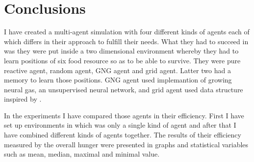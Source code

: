 \chapter{Conclusions}

I have created a multi-agent simulation with four different kinds of agents each of which differs in their approach to fulfill their needs. What they had to succeed in was they were put inside a two dimensional environment whereby they had to learn positions of six food resource so as to be able to survive. They were pure reactive agent, random agent, GNG agent and grid agent. Latter two had a memory to learn those positions. GNG agent used implemantion of growing neural gas, an unsupervised neural network, and grid agent used data structure inspired by \cite{Brom:placeandobjects}.

In the experiments I have compared those agents in their efficiency. First I have set up environments in which was only a single kind of agent and after that I have combined different kinds of agents together. The results of their efficiency measured by the overall hunger were presented in graphs and statistical variables such as mean, median, maximal and minimal value. 


 